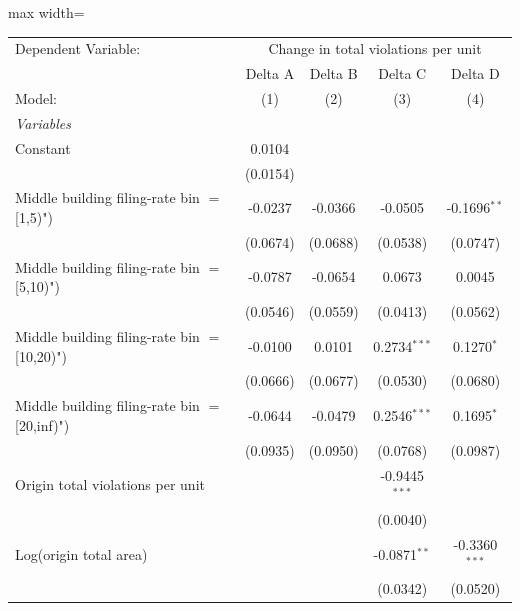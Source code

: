 \documentclass[
  11pt,
]{article}
\begin{document}
\begin{adjustbox}{max width=\textwidth}
\begingroup
\centering
\begin{tabular}{lcccc}
   \tabularnewline \midrule \midrule
   Dependent Variable: & \multicolumn{4}{c}{Change in total violations per unit}\\
                                                  & Delta A  & Delta B  & Delta C         & Delta D \\   
   Model:                                         & (1)      & (2)      & (3)             & (4)\\  
   \midrule
   \emph{Variables}\\
   Constant                                       & 0.0104   &          &                 &   \\   
                                                  & (0.0154) &          &                 &   \\   
   Middle building filing-rate bin $=$ [1,5)")    & -0.0237  & -0.0366  & -0.0505         & -0.1696$^{**}$\\   
                                                  & (0.0674) & (0.0688) & (0.0538)        & (0.0747)\\   
   Middle building filing-rate bin $=$ [5,10)")   & -0.0787  & -0.0654  & 0.0673          & 0.0045\\   
                                                  & (0.0546) & (0.0559) & (0.0413)        & (0.0562)\\   
   Middle building filing-rate bin $=$ [10,20)")  & -0.0100  & 0.0101   & 0.2734$^{***}$  & 0.1270$^{*}$\\   
                                                  & (0.0666) & (0.0677) & (0.0530)        & (0.0680)\\   
   Middle building filing-rate bin $=$ [20,inf)") & -0.0644  & -0.0479  & 0.2546$^{***}$  & 0.1695$^{*}$\\   
                                                  & (0.0935) & (0.0950) & (0.0768)        & (0.0987)\\   
   Origin total violations per unit               &          &          & -0.9445$^{***}$ &   \\   
                                                  &          &          & (0.0040)        &   \\   
   Log(origin total area)                         &          &          & -0.0871$^{**}$  & -0.3360$^{***}$\\   
                                                  &          &          & (0.0342)        & (0.0520)\\   

\end{tabular}
\end{adjustbox}
\end{document}
